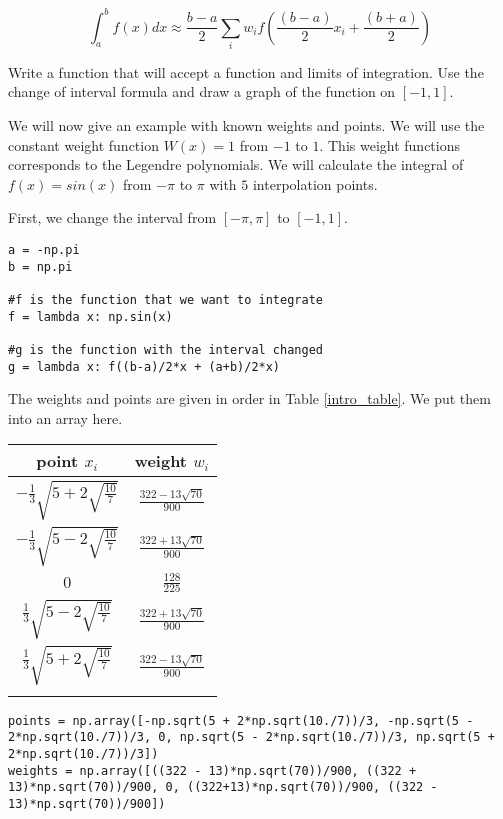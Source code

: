 \[
\int_a^b f(x) dx \approx \frac{b - a}{2} \sum_i w_if(\frac{(b-a)}{2}x_i + \frac{(b+a)}{2})
\]

\begin{problem}
Write a function that will accept a function and limits of integration.  Use the change of interval formula and draw a graph of the function on $[-1,1]$.
\end{problem}

We will now give an example with known weights and points.  We will use the constant weight function $W(x) = 1$ from $-1$ to $1$.  This weight functions corresponds to the Legendre polynomials.  We will calculate the integral of $f(x) = sin(x)$ from $-\pi$ to $\pi$ with $5$ interpolation points.

First, we change the interval from $[-\pi, \pi]$ to $[-1,1]$.

\begin{lstlisting}
a = -np.pi
b = np.pi

#f is the function that we want to integrate
f = lambda x: np.sin(x)

#g is the function with the interval changed
g = lambda x: f((b-a)/2*x + (a+b)/2*x)

\end{lstlisting}

The weights and points are given in order in Table \ref{intro_table}.  We put them into an array here.
\begin{center}
\begin{tabular}{|c|c|}
\hline
point $x_i$ & weight $w_i$ \\
\hline
$-\frac{1}{3}\sqrt{5 + 2\sqrt{\frac{10}{7}}}$ &  $\frac{322-13\sqrt{70}}{900}$ \\
\hline
$-\frac{1}{3}\sqrt{5 - 2\sqrt{\frac{10}{7}}}$ & $\frac{322+13\sqrt{70}}{900}$ \\
\hline
$0$ & $\frac{128}{225}$ \\
\hline
$\frac{1}{3}\sqrt{5 - 2\sqrt{\frac{10}{7}}}$ & $\frac{322+13\sqrt{70}}{900}$ \\
\hline
$\frac{1}{3}\sqrt{5 + 2\sqrt{\frac{10}{7}}}$ & $\frac{322-13\sqrt{70}}{900}$ \\
\hline
\label{intro_table}
\end{tabular}
\end{center}
\begin{lstlisting}
points = np.array([-np.sqrt(5 + 2*np.sqrt(10./7))/3, -np.sqrt(5 - 2*np.sqrt(10./7))/3, 0, np.sqrt(5 - 2*np.sqrt(10./7))/3, np.sqrt(5 + 2*np.sqrt(10./7))/3]) 
weights = np.array([((322 - 13)*np.sqrt(70))/900, ((322 + 13)*np.sqrt(70))/900, 0, ((322+13)*np.sqrt(70))/900, ((322 - 13)*np.sqrt(70))/900])
\end{lstlisting}

